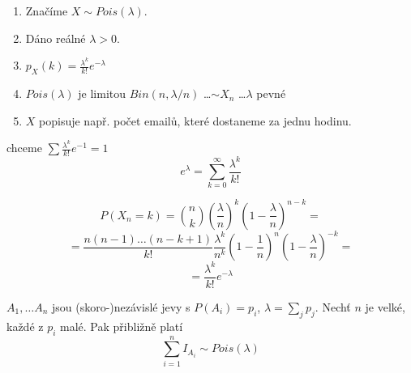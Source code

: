 \documentclass[../main.tex]{subfiles}
\begin{document}
\begin{definition}

    \begin{enumerate}
        \item Značíme $X \sim Pois(\lambda)$.
        \item Dáno reálné $\lambda > 0$.
        \item $p_X(k) = \frac{\lambda^k}{k!}e^{-\lambda}$
        \item $Pois(\lambda)$ je limitou $Bin(n,\lambda/n)$ \dots $\sim X_n$ \dots $\lambda$ pevné
        \item $X$ popisuje např. počet emailů, které dostaneme za jednu hodinu.
    \end{enumerate}

    chceme $\sum \frac{\lambda^k}{k!}e^{-1} = 1$
    \[e^\lambda =  \sum^\infty_{k=0} \frac{\lambda^k}{k!}\]

    \[P(X_n = k) = \binom{n}{k}\left(\frac{\lambda}{n}\right)^k\left(1-\frac{\lambda}{n}\right)^{n-k} =\]
    \[=\frac{n(n-1)\dots (n-k+1)}{k!} \frac{\lambda^k}{n^k} \left(1-\frac{1}{n}\right)^n \left(1-\frac{\lambda}{n}\right)^{-k}=\]
    \[ = \frac{\lambda^k}{k!}e^{-\lambda}\]
\end{definition}

\begin{remark}

    $A_1,\dots A_n$ jsou (skoro-)nezávislé jevy s $P(A_i) = p_i$,
    $\lambda = \sum_j p_j$. Nechť $n$ je velké, každé z $p_i$ malé. Pak přibližně platí
    \[\sum^n_{i=1}I_{A_i} \sim Pois(\lambda)\]
\end{remark}
\end{document}
